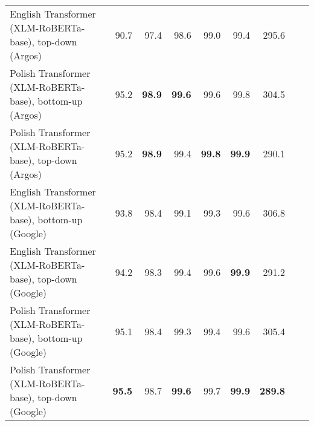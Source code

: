 \begin{table}[ht!]
{\begin{tabular}{lrrrrrrrr}
  English Transformer (XLM-RoBERTa-base), top-down (Argos) & 90.7 & 97.4 & 98.6 & 99.0 & 99.4 & 295.6 \\ 
  Polish Transformer (XLM-RoBERTa-base), bottom-up (Argos) & 95.2 & \textbf{98.9} & \textbf{99.6} & 99.6 & 99.8 & 304.5 \\ 
  Polish Transformer (XLM-RoBERTa-base), top-down (Argos) & 95.2 & \textbf{98.9} & 99.4 & \textbf{99.8} & \textbf{99.9} & 290.1 \\ 
  English Transformer (XLM-RoBERTa-base), bottom-up (Google) & 93.8 & 98.4 & 99.1 & 99.3 & 99.6 & 306.8 \\ 
  English Transformer (XLM-RoBERTa-base), top-down (Google) & 94.2 & 98.3 & 99.4 & 99.6 & \textbf{99.9} & 291.2 \\ 
  Polish Transformer (XLM-RoBERTa-base), bottom-up (Google) & 95.1 & 98.4 & 99.3 & 99.4 & 99.6 & 305.4 \\ 
  Polish Transformer (XLM-RoBERTa-base), top-down (Google) & \textbf{95.5} & 98.7 & \textbf{99.6} & 99.7 & \textbf{99.9} & \textbf{289.8} \\ 
   \hline
\end{tabular}
}
\end{table}




